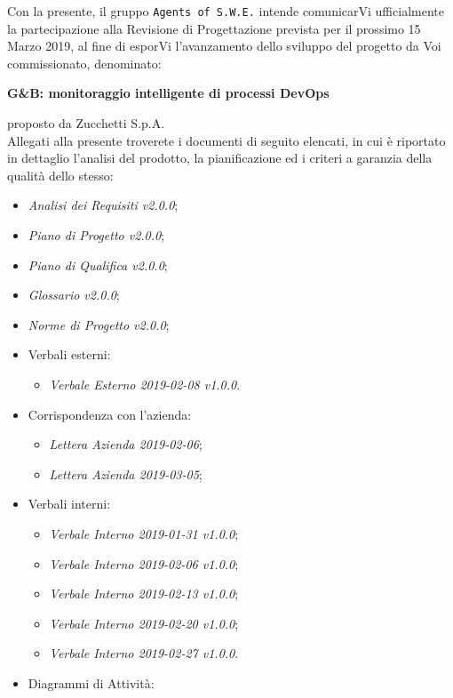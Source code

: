 \documentclass[11pt, a4paper]{letter} %
\begin{document}
\begin{letter}
		Con la presente, il gruppo \texttt{Agents of S.W.E.} intende comunicarVi ufficialmente la partecipazione alla Revisione di Progettazione prevista per il prossimo 15 Marzo 2019, al fine di esporVi l'avanzamento dello sviluppo del progetto da Voi commissionato, denominato:
		\begin{center}
			\textbf{G\&B: monitoraggio intelligente di processi DevOps}
		\end{center}
		proposto da Zucchetti S.p.A.\\
		Allegati alla presente troverete i documenti di seguito elencati, in cui è riportato in dettaglio l'analisi del prodotto, la pianificazione ed i criteri a garanzia della qualità dello stesso:
		\begin{itemize}
			\item \textit{Analisi dei Requisiti v2.0.0};
			\item  \textit{Piano di Progetto v2.0.0};
			\item \textit{Piano di Qualifica v2.0.0};
			\item \textit{Glossario v2.0.0};
			\item \textit{Norme di Progetto v2.0.0};	
			\item Verbali esterni: 
			\begin{itemize}
				\item \textit{Verbale Esterno 2019-02-08 v1.0.0}.
			\end{itemize}
			\item Corrispondenza con l'azienda: 
			\begin{itemize}
				\item \textit{Lettera Azienda 2019-02-06};
				\item \textit{Lettera Azienda 2019-03-05};
			\end{itemize}
			\item Verbali interni: 
			\begin{itemize}
				\item \textit{Verbale Interno 2019-01-31 v1.0.0};
				\item \textit{Verbale Interno 2019-02-06 v1.0.0};
				\item \textit{Verbale Interno 2019-02-13 v1.0.0};
				\item \textit{Verbale Interno 2019-02-20 v1.0.0};
				\item \textit{Verbale Interno 2019-02-27 v1.0.0}.
			\end{itemize}
		\item Diagrammi di Attività: 
		\begin{itemize}

\end{itemize}
\end{itemize}
\end{letter}
\end{document}
